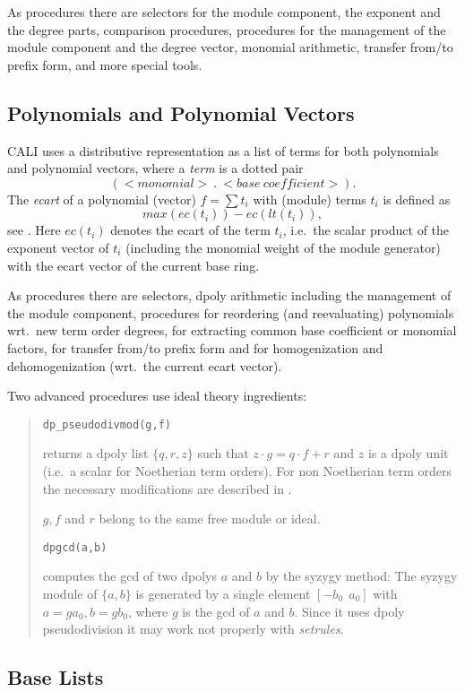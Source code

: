 \documentclass[a4paper,11pt]{article}
\newcommand{\ind}[1]{{\em #1}\index{#1}}
\newcommand{\pbx}[1]{\mbox{}\hfill \parbox[t]{12cm}{#1} \pagebreak[3]}
\begin{document}
As procedures there are selectors for the module component, the exponent and
the degree parts, comparison procedures, procedures for the management of
the module component and the degree vector, monomial arithmetic, transfer 
from/to prefix form, and more special tools.  

\subsection{Polynomials and Polynomial Vectors}

CALI uses a distributive representation as a list of terms for both
polynomials and polynomial vectors, where a \ind{term} is a dotted
pair
\[(<monomial>\ .\ <base\ coefficient>).\] 
The \ind{ecart} of a polynomial (vector) $f=\sum{t_i}$ with (module)
terms $t_i$ is defined as \[max(ec(t_i))-ec(lt(t_i)),\] see
\cite{tcah}. Here $ec(t_i)$ denotes the ecart of the term $t_i$, i.e.\
the scalar product of the exponent vector of $t_i$ (including the
monomial weight of the module generator) with the ecart vector of the
current base ring.

As procedures there are selectors, dpoly arithmetic including the management
of the module component, procedures for reordering (and reevaluating)
polynomials wrt.\ new term order degrees, for extracting common base
coefficient or monomial factors, for transfer from/to prefix form and for
homogenization and dehomogenization (wrt.\ the current ecart vector).

Two advanced procedures use ideal theory ingredients:
\begin{quote}
\verb|dp_pseudodivmod(g,f)|

\pbx{returns a dpoly list $\{q,r,z\}$ such that $z\cdot g = q\cdot f +
r$ and $z$ is a dpoly unit (i.e.\ a scalar for Noetherian term
orders). For non Noetherian term orders the necessary modifications
are described in \cite{ala}. 

$g, f$ and $r$ belong to the same free module or ideal.
}

\verb|dpgcd(a,b)| 

\pbx{computes the gcd of two dpolys $a$ and $b$ by the syzygy method:
The syzygy module of $\{a,b\}$ is generated by a single element
$[-b_0\ \ a_0]$ with $a=ga_0, b=gb_0$, where $g$ is the gcd of $a$
and $b$. Since it uses dpoly pseudodivision it may work not properly
with \ind{setrules}.}
\end{quote}


\subsection{Base Lists}
\end{document}
